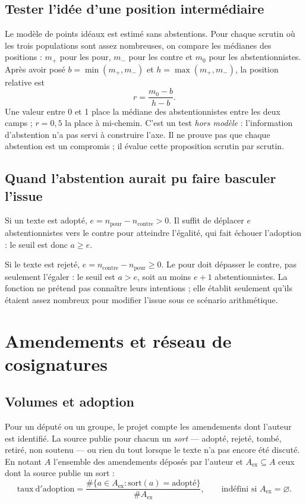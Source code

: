 \documentclass[11pt,a4paper]{article}
\begin{document}
\subsection{Tester l'idée d'une position intermédiaire}

Le modèle de points idéaux est estimé sans abstentions. Pour chaque scrutin où
les trois populations sont assez nombreuses, on compare les médianes des
positions : $m_+$ pour les pour, $m_-$ pour les contre et $m_0$ pour les
abstentionnistes. Après avoir posé $b=\min(m_+,m_-)$ et $h=\max(m_+,m_-)$, la
position relative est
\[
 r=\frac{m_0-b}{h-b}.
\]
Une valeur entre 0 et 1 place la médiane des abstentionnistes entre les deux
camps ; $r=0{,}5$ la place à mi-chemin. C'est un test \emph{hors modèle} :
l'information d'abstention n'a pas servi à construire l'axe. Il ne prouve pas
que chaque abstention est un compromis ; il évalue cette proposition scrutin
par scrutin.

\subsection{Quand l'abstention aurait pu faire basculer l'issue}

Si un texte est adopté, $e=n_{\mathrm{pour}}-n_{\mathrm{contre}}>0$. Il suffit
de déplacer $e$ abstentionnistes vers le contre pour atteindre l'égalité, qui
fait échouer l'adoption : le seuil est donc $a\geq e$.

Si le texte est rejeté, $e=n_{\mathrm{contre}}-n_{\mathrm{pour}}\geq0$. Le pour
doit dépasser le contre, pas seulement l'égaler : le seuil est $a>e$, soit au
moins $e+1$ abstentionnistes. La fonction ne prétend pas connaître leurs
intentions ; elle établit seulement qu'ils étaient assez nombreux pour modifier
l'issue sous ce scénario arithmétique.

\section{Amendements et réseau de cosignatures}
\label{sec:cosign}

\subsection{Volumes et adoption}

Pour un député ou un groupe, le projet compte les amendements dont l'auteur est
identifié. La source publie pour chacun un \emph{sort} — adopté, rejeté, tombé,
retiré, non soutenu — ou rien du tout lorsque le texte n'a pas encore été
discuté. En notant $A$ l'ensemble des amendements déposés par l'auteur et
$A_{\mathrm{ex}}\subseteq A$ ceux dont la source publie un sort :
\[
 \mathrm{taux\ d'adoption}=\frac{\#\{a\in A_{\mathrm{ex}} : \text{sort}(a)=\text{adopté}\}}
 {\#A_{\mathrm{ex}}},
 \qquad \text{indéfini si } A_{\mathrm{ex}}=\varnothing .
\]
\end{document}
